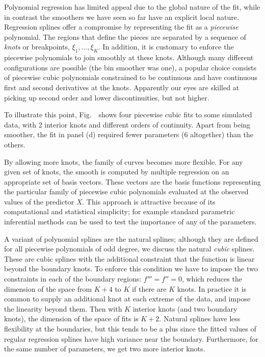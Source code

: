 \Sectionskip
{}
Polynomial regression has limited appeal due to the global nature of the 
fit, while in contrast the smoothers we have seen so far have an explicit local nature.
Regression splines offer a compromise by representing the fit as a {\sl piecewise}
polynomial. 
The regions that define the pieces are separated by a sequence
of {\sl knots} or breakpoints, $\xi_1,\ldots,\xi_K$. 
In addition, it is customary to enforce the piecewise polynomials to join smoothly at these knots. 
Although many different configurations are possible (the bin smoother was one), a popular choice  
consists of piecewise cubic polynomials constrained to be continuous and have continuous first and second derivatives at the knots. 
Apparently our eyes are skilled at picking up second order and lower discontinuities, but not higher.

\par
To illustrate this point, Fig.~\BS\ shows four piecewise cubic fits to some simulated data, with 2
interior knots and different orders of continuity. 
Apart from being smoother, the fit in panel (d) required fewer parameters (6 altogether) than  the others.

By allowing more knots, the family of curves becomes more flexible.
For any given set of knots, the smooth is computed by  multiple regression on an appropriate set of basis vectors. 
These vectors are the basis functions representing the particular family of piecewise cubic polynomials evaluated at the observed values of the predictor $X$.
This approach is attractive because 
of its computational and statistical simplicity;  for example  standard
parametric inferential  methods  can be used to test the importance 
of any of the parameters.

A variant of polynomial splines are the natural splines; although they are defined for  all piecewise polynomials of odd degree, we  discuss the natural {\sl cubic} splines. 
These are cubic splines with the additional constraint that the function is linear beyond the boundary knots. 
To enforce this condition we have to impose the two constraints in each of the boundary  regions: $f'''=f''=0$, which reduces the dimension of the space from $K+4$ to $K$ if there are $K$ knots. 
In practice it is common to supply an additional knot at each extreme of the data, and impose the linearity beyond them. 
Then with $K$ interior knots (and two boundary knots), the dimension of the space of fits is $K+2$. 
Natural splines have less flexibility at the boundaries, but this tends to be a plus since the fitted values of regular regression splines have high variance near the boundary.
Furthermore, for the same number of parameters, we get two more interior knots.  

